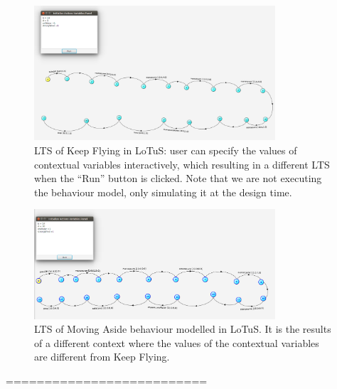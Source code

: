 \begin{figure}
 \includegraphics[width=0.8\textwidth]{figures/5-KeepFlying-final-LTS.png}
    \caption{LTS of Keep Flying in LoTuS: user can specify the values of contextual variables interactively, which resulting in a different LTS when the ``Run'' button is clicked. Note that we are not executing the behaviour model, only simulating it at the design time.}
    \label{fig:keepflying}
    \vspace*{-0.25cm}
\end{figure}

\begin{figure}
 \includegraphics[width=0.8\textwidth]{figures/6-MoveAside-final-LTS.png}
    \caption{LTS of Moving Aside behaviour modelled in LoTuS. It is the results of a different context where the values of the contextual variables are different from Keep Flying.}
    \label{fig:movingaside}
    \vspace*{-0.25cm}
\end{figure}

==========================

